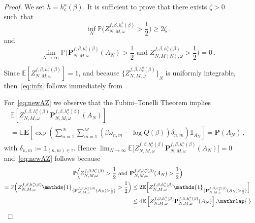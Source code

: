 \documentclass[AHL,Unicode,longabstracts]{cedram}
\newcommand{\gb}{\beta}
\newcommand{\unbf}%
{\mathds{1}}
\newcommand{\bP}{\ensuremath{\mathbf{P}}}
\newcommand{\bE}{\ensuremath{\mathbf{E}}}
\newcommand{\bbE}{\ensuremath{\mathbb{E}}}
\newcommand{\bbP}{\ensuremath{\mathbb{P}}}
\begin{document}
\begin{proof}
We set $h=h_c^{a}(\gb)$. It is sufficient to prove that there exists $\zeta>0$ such~that
\begin{equation}\label{eq:infz}
\inf_N \bbP \Big(Z^{f,\gb,h_c^{a}(\gb)}_{N,M,\omega} > \frac{1}{2} \Big) \ge 2\zeta\,.
\end{equation}
and
\begin{equation}\label{eq:newAZ}
\lim_{N \to \infty}
\bbP \Big(\bP^{f,\gb,h_c^{a}(\gb)}_{N,M,\omega} (A_N)>\frac{1}{2}
\text{ and } Z^{f,\gb,h_c^{a}(\gb)}_{N,M(N),\omega} > \frac{1}{2} \Big)=0\,.
\end{equation}

Since $ \bbE [Z^{f,\gb,h_c^{a}(\gb)}_{N,M,\omega}] = 1$, and because ${ \lbrace {Z^{f,\gb,h_c^{a}(\gb)}_{N,M,\omega}} \rbrace}_{N}$ is uniformly integrable, then~\eqref{eq:infz} follows immediately from~\cite[Lemma~4.6]{cf:G}.

For~\eqref{eq:newAZ} we observe that the Fubini--Tonelli Theorem implies
\begin{multline*}
\bbE \left[Z^{f,\gb,h_c^{a}(\gb)}_{N,M,\omega} \bP^{f,\gb,h_c^{a}(\gb)}_{N,M,\omega} (A_N) \right]\\
=\bbE \bE \left[\exp \left(\sum_{n=1}^N \sum_{m=1}^M (\beta \omega_{n,m} - \log Q(\beta)) \delta_{n,m} \right) \unbf_{ A_{N}} \right]=\bP(A_N)\,,
\end{multline*}
with $ \delta_{n,m} \!:=\! \unbf_{(n,m) \in \tau}$. Hence $\lim_{N\to\infty} \bbE \big[Z^{f,\gb,h_c^{a}(\gb)}_{N,M,\omega} \bP^{f,\gb,h_c^{a}(\gb)}_{N,M,\omega} (A_N) \big]\! =\! 0$ and~\eqref{eq:newAZ} follows because
\begin{multline}
\bbP \Big(Z^{f,\gb,h_c^{a}(\gb)}_{N,M,\omega}> \frac{1}{2} \text{ and } \bP^{f,\gb,h_c^{a}(\gb)}_{N,M,\omega} (A_N)> \frac{1}{2} \Big)\\
\begin{aligned}
=\bbP \Big(Z^{f,\gb,h_c^{a}(\gb)}_{N,M,\omega}\unbf_{ \{\bP^{f,\gb,h_c^{a}(\gb)}_{N,M,\omega} (A_N)> \frac{1}{2} \}}> \frac{1}{2} \Big)
&\le 2\bbE \Big[Z^{f,\gb,h_c^{a}(\gb)}_{N,M,\omega} \unbf_{ \{\bP^{f,\gb,h_c^{a}(\gb)}_{N,M,\omega} (A_N)> \frac{1}{2} \}} \Big]\: \\
&\le 4 \bbE \left[Z^{f,\gb,h_c^{a}(\gb)}_{N,M,\omega} \bP^{f,\gb,h_c^{a}(\gb)}_{N,M,\omega} (A_N) \right].\mathrlap{\,\qed}
\end{aligned}
\end{multline}
\let\qed\relax
\end{proof}
\end{document}
